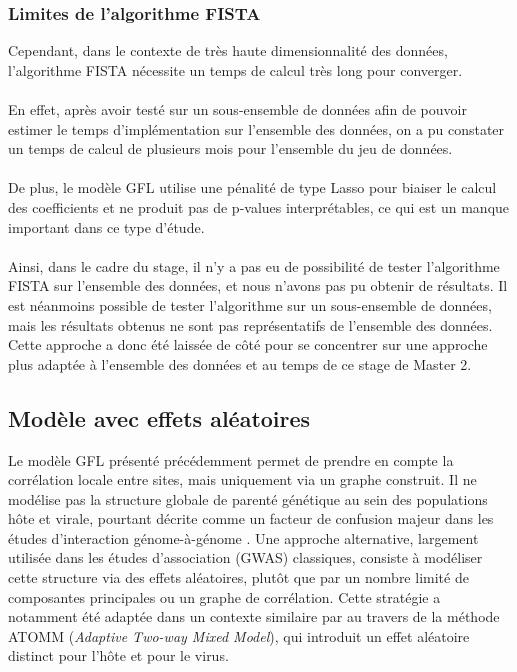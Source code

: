 \documentclass[11pt,a4paper]{article}
\begin{document}
\subsubsection{Limites de l'algorithme FISTA}
Cependant, dans le contexte de très haute dimensionnalité des données, l'algorithme FISTA
nécessite un temps de calcul très long pour converger.
\\
\\
En effet, après avoir testé sur un sous-ensemble de données afin de pouvoir estimer 
le temps d'implémentation sur l'ensemble des données, on a pu constater un temps de calcul
de plusieurs mois pour l'ensemble du jeu de données.
\\
\\
De plus, le modèle GFL utilise une pénalité de type Lasso pour biaiser le calcul des coefficients et ne produit pas de p-values interprétables, ce qui est un manque important dans ce type d'étude.
\\
\\
Ainsi, dans le cadre du stage, il n'y a pas eu de possibilité de tester l'algorithme FISTA sur l'ensemble des données,
et nous n'avons pas pu obtenir de résultats. Il est néanmoins possible de tester l'algorithme sur un sous-ensemble de données, mais les résultats obtenus ne sont pas représentatifs de l'ensemble des données.
Cette approche a donc été laissée de côté pour se concentrer sur une approche plus adaptée à l'ensemble des données et au temps de ce stage de Master 2.

\vspace{1cm}

\subsection{Modèle avec effets aléatoires}

Le modèle GFL présenté précédemment permet de prendre en compte la
corrélation locale entre sites, mais uniquement via un graphe construit.
Il ne modélise pas la structure globale de
parenté génétique au sein des populations hôte et virale, pourtant décrite
comme un facteur de confusion majeur dans les études d'interaction
génome-à-génome \cite{Naret2018}. Une approche alternative, largement
utilisée dans les études d'association (GWAS) classiques,
consiste à modéliser cette structure via des effets aléatoires,
plutôt que par un nombre limité de composantes principales ou un graphe de
corrélation. Cette stratégie a notamment été adaptée dans un contexte similaire par
\cite{ATOMM} au travers de la méthode ATOMM (\textit{Adaptive Two-way Mixed Model}),
qui introduit un effet aléatoire distinct pour l'hôte et pour le virus.
\end{document}
